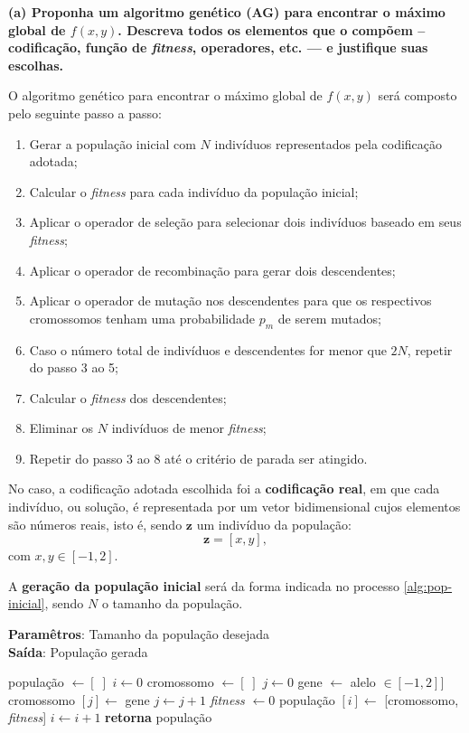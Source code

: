 \documentclass[a4paper, 12pt]{article}
\newcommand{\fitness}{\textit{fitness}\xspace}
\newenvironment{brprocess}[1][]
  {\begin{algorithm}[#1]
     \selectlanguage{brazilian}%
     \floatname{algorithm}{Processo}%
     \renewcommand{\algorithmicif}{\textbf{se}}%
     \renewcommand{\algorithmicfor}{\textbf{para}}%
     \renewcommand{\algorithmicdo}{\textbf{faça}}%
     \renewcommand{\algorithmicthen}{\textbf{faça}}%
     \renewcommand{\algorithmicend}{\textbf{fim}}%
     \renewcommand{\algorithmicwhile}{\textbf{enquanto}}%
     \renewcommand{\algorithmicelse}{\textbf{caso contrário}}%
  }
  {\end{algorithm}}
\begin{document}
\textbf{(a) Proponha um algoritmo genético (AG) para encontrar o máximo global de $f(x, y)$. Descreva todos os elementos que o compõem – codificação, função de \fitness, operadores, etc. — e justifique suas escolhas.}

O algoritmo genético para encontrar o máximo global de $f(x, y)$ será composto pelo seguinte passo a passo:
\begin{enumerate}
    \item Gerar a população inicial com $N$ indivíduos representados pela codificação adotada;
    \item Calcular o \fitness para cada indivíduo da população inicial;
    \item Aplicar o operador de seleção para selecionar dois indivíduos baseado em seus \textit{fitness};
    \item Aplicar o operador de recombinação para gerar dois descendentes;
    \item Aplicar o operador de mutação nos descendentes para que os respectivos cromossomos tenham uma probabilidade $p_m$ de serem mutados;
    \item Caso o número total de indivíduos e descendentes for menor que $2N$, repetir do passo 3 ao 5;
    \item Calcular o \fitness dos descendentes;
    \item Eliminar os $N$ indivíduos de menor \fitness;
    \item Repetir do passo 3 ao 8 até o critério de parada ser atingido.
\end{enumerate}

No caso, a codificação adotada escolhida foi a \textbf{codificação real}, em que cada indivíduo, ou solução, é representada por um vetor bidimensional cujos elementos são números reais, isto é, sendo $\bm{z}$ um indivíduo da população:
\begin{equation}
    \bm{z} = \left[x, y \right],
\end{equation}
com $x,y \in [-1, 2]$.

A \textbf{geração da população inicial} será da forma indicada no processo \ref{alg:pop-inicial}, sendo $N$ o tamanho da população.
\begin{brprocess}[!ht]
    \textbf{Paramêtros}: Tamanho da população desejada\\
    \textbf{Saída}: População gerada
    \cprotect\caption{Geração aleatória da população inicial (\verb|gerar_pop(N)|)}
    \begin{algorithmic}
    \State população $\gets [\;]$
    \State $i\gets 0$
        \State cromossomo $\gets [\;]$
        \State $j \gets 0$
            \State gene $\gets$ alelo $\in [-1, 2]]$
            \State cromossomo $[j] \gets$ gene
            \State $j \gets j + 1$
        \EndWhile
        \State \textit{fitness} $\gets 0$
        \State população $[i] \gets$ [cromossomo, \textit{fitness}]
        \State $i \gets i + 1$
    \EndWhile
    \State \textbf{retorna} população
    \end{algorithmic}
    \label{alg:pop-inicial}
\end{brprocess}
\end{document}
